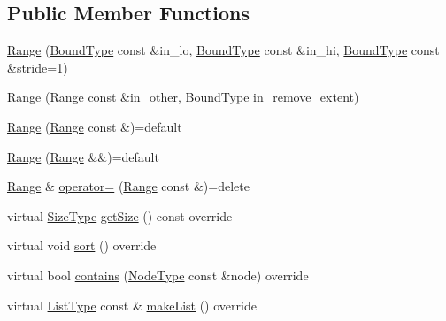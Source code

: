 \subsection*{Public Member Functions}
\begin{DoxyCompactItemize}
\item 
\hyperlink{structvt_1_1group_1_1region_1_1_range_a6691cd13c504bdabbb67129f652b816a}{Range} (\hyperlink{structvt_1_1group_1_1region_1_1_region_abf426ff85bed72c1c6524fad6a9f1751}{Bound\+Type} const \&in\+\_\+lo, \hyperlink{structvt_1_1group_1_1region_1_1_region_abf426ff85bed72c1c6524fad6a9f1751}{Bound\+Type} const \&in\+\_\+hi, \hyperlink{structvt_1_1group_1_1region_1_1_region_abf426ff85bed72c1c6524fad6a9f1751}{Bound\+Type} const \&stride=1)
\item 
\hyperlink{structvt_1_1group_1_1region_1_1_range_a9cd7425570ad25a2d5faf70b5f233bbd}{Range} (\hyperlink{structvt_1_1group_1_1region_1_1_range}{Range} const \&in\+\_\+other, \hyperlink{structvt_1_1group_1_1region_1_1_region_abf426ff85bed72c1c6524fad6a9f1751}{Bound\+Type} in\+\_\+remove\+\_\+extent)
\item 
\hyperlink{structvt_1_1group_1_1region_1_1_range_aaf4f48ee287bd842d3a0c1260737bcb1}{Range} (\hyperlink{structvt_1_1group_1_1region_1_1_range}{Range} const \&)=default
\item 
\hyperlink{structvt_1_1group_1_1region_1_1_range_a58248b99e3e8dfbf73a014d2af6f238c}{Range} (\hyperlink{structvt_1_1group_1_1region_1_1_range}{Range} \&\&)=default
\item 
\hyperlink{structvt_1_1group_1_1region_1_1_range}{Range} \& \hyperlink{structvt_1_1group_1_1region_1_1_range_a7a1ee1554643ce6074d24dc129cef8a1}{operator=} (\hyperlink{structvt_1_1group_1_1region_1_1_range}{Range} const \&)=delete
\item 
virtual \hyperlink{structvt_1_1group_1_1region_1_1_region_a9bb381adf31111aae34dbc644bad6c1f}{Size\+Type} \hyperlink{structvt_1_1group_1_1region_1_1_range_a111a632a4bba6b6940a3d036bd4cba76}{get\+Size} () const override
\item 
virtual void \hyperlink{structvt_1_1group_1_1region_1_1_range_aa24e09be54662ffd11413803689ed7f8}{sort} () override
\item 
virtual bool \hyperlink{structvt_1_1group_1_1region_1_1_range_a1e8b87b37b06d3803fd3b287fde3564b}{contains} (\hyperlink{namespacevt_a866da9d0efc19c0a1ce79e9e492f47e2}{Node\+Type} const \&node) override
\item 
virtual \hyperlink{structvt_1_1group_1_1region_1_1_region_a4e35b2fc6dca06aca0b7bc0e19b35c5a}{List\+Type} const  \& \hyperlink{structvt_1_1group_1_1region_1_1_range_abd64b2d424a89ab0f603be15957d0fd4}{make\+List} () override

\end{DoxyCompactItemize}
